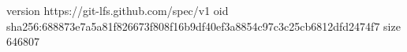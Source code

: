 version https://git-lfs.github.com/spec/v1
oid sha256:688873e7a5a81f826673f808f16b9df40ef3a8854c97c3c25cb6812dfd2474f7
size 646807
